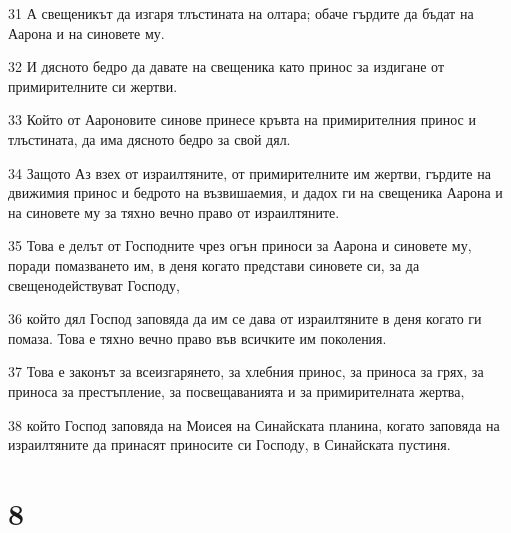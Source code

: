 \par 31 А свещеникът да изгаря тлъстината на олтара; обаче гърдите да бъдат на Аарона и на синовете му.
\par 32 И дясното бедро да давате на свещеника като принос за издигане от примирителните си жертви.
\par 33 Който от Аароновите синове принесе кръвта на примирителния принос и тлъстината, да има дясното бедро за свой дял.
\par 34 Защото Аз взех от израилтяните, от примирителните им жертви, гърдите на движимия принос и бедрото на възвишаемия, и дадох ги на свещеника Аарона и на синовете му за тяхно вечно право от израилтяните.
\par 35 Това е делът от Господните чрез огън приноси за Аарона и синовете му, поради помазването им, в деня когато представи синовете си, за да свещенодействуват Господу,
\par 36 който дял Господ заповяда да им се дава от израилтяните в деня когато ги помаза. Това е тяхно вечно право във всичките им поколения.
\par 37 Това е законът за всеизгарянето, за хлебния принос, за приноса за грях, за приноса за престъпление, за посвещаванията и за примирителната жертва,
\par 38 който Господ заповяда на Моисея на Синайската планина, когато заповяда на израилтяните да принасят приносите си Господу, в Синайската пустиня.

\chapter{8}

